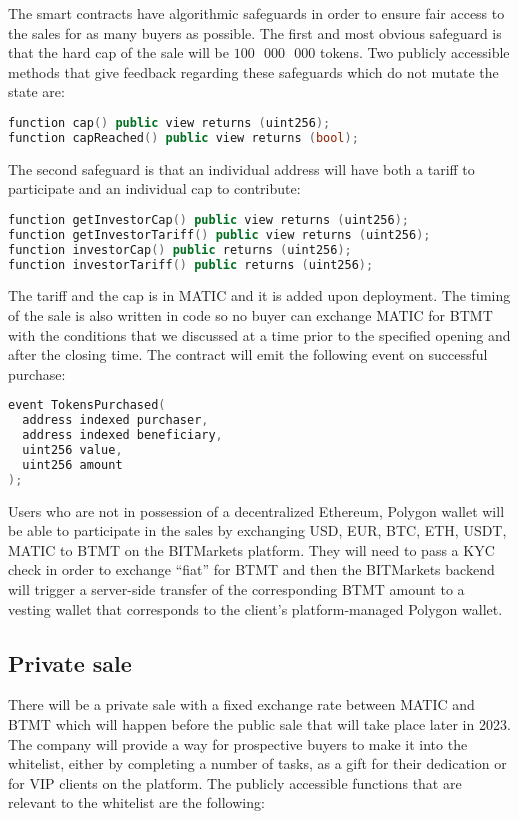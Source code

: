 \documentclass[a4paper,12pt]{article}
\begin{document}
The smart contracts have algorithmic safeguards in order to ensure fair access to
the sales for as many buyers as possible.
The first and most obvious safeguard is that the hard cap of the sale will be
$100\text{ }000\text{ }000$ tokens. Two publicly accessible methods that give feedback regarding these safeguards which do not mutate the state are:
\begin{lstlisting}[language=C++, caption=Solidity sales cap function signatures.]
function cap() public view returns (uint256);
function capReached() public view returns (bool);
\end{lstlisting}
The second safeguard is that an individual address will have
both a tariff to participate and an individual cap to contribute:
\begin{lstlisting}[language=C++, caption=Solidity sales tariff/cap function signatures.]
function getInvestorCap() public view returns (uint256);
function getInvestorTariff() public view returns (uint256);
function investorCap() public returns (uint256);
function investorTariff() public returns (uint256);
\end{lstlisting}
The tariff and the cap is in MATIC and it is added upon deployment.
The timing of the sale is also written in code so no buyer can exchange MATIC for BTMT
with the conditions that we discussed at a time prior to the specified opening and after the closing time.
The contract will emit the following event on successful purchase:
\begin{lstlisting}[language=C++, caption=BTMT private sale events.]
event TokensPurchased(
  address indexed purchaser,
  address indexed beneficiary,
  uint256 value,
  uint256 amount
);
\end{lstlisting}

Users who are not in possession of a decentralized Ethereum, Polygon wallet will be able to
participate in the sales by exchanging USD, EUR, BTC, ETH, USDT, MATIC to BTMT
on the BITMarkets platform. They will need to pass a KYC check in order to exchange
``fiat'' for BTMT and then the BITMarkets backend
will trigger a server-side transfer of the corresponding BTMT amount to a vesting wallet that corresponds to the client's platform-managed Polygon wallet.

\subsection{Private sale}

There will be a private sale with a fixed exchange rate between MATIC and BTMT which will happen before the public sale that will take place later in 2023.
The company will provide a way for prospective buyers to make it into the whitelist, either by completing a number of tasks, as a gift for their dedication or for VIP clients on the platform.
The publicly accessible functions that are relevant to the whitelist are the following:
\end{document}
